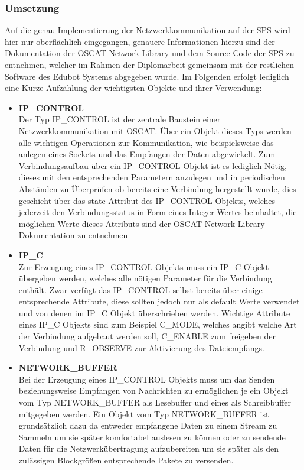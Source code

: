 \subsubsection{Umsetzung}
Auf die genau Implementierung der Netzwerkkommunikation auf der SPS wird hier nur oberflächlich eingegangen, genauere Informationen hierzu sind der Dokumentation der OSCAT Network Library und dem Source Code der SPS zu entnehmen, welcher im Rahmen der Diplomarbeit gemeinsam mit der restlichen Software des Edubot Systems abgegeben wurde. Im Folgenden erfolgt lediglich eine Kurze Aufzählung der wichtigsten Objekte und ihrer Verwendung:
\begin{itemize}
\item \textbf{IP\_CONTROL}\\
Der Typ IP\_CONTROL ist der zentrale Baustein einer Netzwerkkommunikation mit OSCAT. Über ein Objekt dieses Typs werden alle wichtigen Operationen zur Kommunikation, wie beispielsweise das anlegen eines Sockets und das Empfangen der Daten abgewickelt. Zum Verbindungsaufbau über ein IP\_CONTROL Objekt ist es lediglich Nötig, dieses mit den entsprechenden Parametern anzulegen und in periodischen Abständen zu Überprüfen ob bereits eine Verbindung hergestellt wurde, dies geschieht über das state Attribut des IP\_CONTROL Objekts, welches jederzeit den Verbindungsstatus in Form eines Integer Wertes beinhaltet, die möglichen Werte dieses Attributs sind der OSCAT Network Library Dokumentation zu entnehmen

\item \textbf{IP\_C}\\
Zur Erzeugung eines IP\_CONTROL Objekts muss ein IP\_C Objekt übergeben werden, welches alle nötigen Parameter für die Verbindung enthält. Zwar verfügt das IP\_CONTROL selbst bereits über einige entsprechende Attribute, diese sollten jedoch nur als default Werte verwendet und von denen im IP\_C Objekt überschrieben werden. 
Wichtige Attribute eines IP\_C Objekts sind zum Beispiel C\_MODE, welches angibt welche Art der Verbindung aufgebaut werden soll, C\_ENABLE zum freigeben der Verbindung und R\_OBSERVE zur Aktivierung des Dateiempfangs.

\item \textbf{NETWORK\_BUFFER}\\
Bei der Erzeugung eines IP\_CONTROL Objekts muss um das Senden beziehungsweise Empfangen von Nachrichten zu ermöglichen je ein Objekt vom Typ NETWORK\_BUFFER als Lesebuffer und eines als Schreibbuffer mitgegeben werden. Ein Objekt vom Typ NETWORK\_BUFFER ist grundsätzlich dazu da entweder empfangene Daten zu einem Stream zu Sammeln um sie später komfortabel auslesen zu können oder zu sendende Daten für die Netzwerkübertragung aufzubereiten um sie später als den zulässigen Blockgrößen entsprechende Pakete zu versenden.
\end{itemize}

